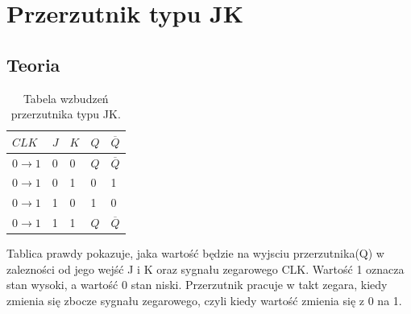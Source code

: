\documentclass[12pt]{article}
\begin{document}
\section{Przerzutnik typu JK}
\subsection{Teoria}
\begin{table}[h!]
\renewcommand{\arraystretch}{1.5}
\begin{center}
\begin{tabular}{C{0.6in}|C{0.3in}|C{0.3in}|C{0.3in}|C{0.3in}}
\hline
\hline
$CLK$ & $J$ & $K$ & $Q$ & $\overline{Q}$	\\
\hline
$0 \rightarrow 1$ & 0 & 0 & $Q$ & $\overline{Q}$ \\
$0 \rightarrow 1$ & 0 & 1 & 0 & 1 \\
$0 \rightarrow 1$ & 1 & 0 & 1 & 0 \\
$0 \rightarrow 1$ & 1 & 1 & $Q$ & $\overline{Q}$ \\
\hline
\hline
\end{tabular}
\caption{Tabela wzbudzeń przerzutnika typu JK.}
\label{tab:table1}
\end{center}
\renewcommand{\arraystretch}{1}
\end{table}
Tablica prawdy pokazuje, jaka wartość będzie na wyjsciu przerzutnika(Q) w zalezności od jego wejść J i K oraz sygnału zegarowego CLK. Wartość 1 oznacza stan wysoki, a wartość 0 stan niski. Przerzutnik pracuje w takt zegara, kiedy zmienia się zbocze sygnału zegarowego, czyli kiedy wartość zmienia się z 0 na 1.
\end{document}
